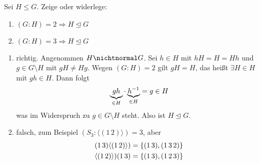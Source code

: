 \begin{uebungsblatt}
\setcounter{taskcount}{40}

\begin{uebung}[Präsens]
	Sei $H\le G$. Zeige oder widerlege:
	\begin{enumerate}[label=\alph*)]
		\item $(G\colon H) = 2\Rightarrow H\unlhd G$
		\item $(G\colon H) = 3\Rightarrow H\unlhd G$
	\end{enumerate}
\end{uebung}
\begin{loesung}
	\begin{enumerate}[label=\alph*)]
		\item richtig. Angenommen $H\nichtnormal G$. Sei $h\in H$ mit $hH=H=Hh$ und $g\in G\setminus H$ mit $gH\neq Hg$. Wegen $(G\colon H)=2$ gilt $gH=H$, das heißt $\exists H\in H$ mit $gh\in H$. Dann folgt
		\begin{align}
			\underbrace{gh}_{\in H}\cdot \underbrace{h^{-1}}_{\in H} = g\in H\notag
		\end{align}
		was im Widerspruch zu $g\in G\setminus H$ steht. Also ist $H\unlhd G$.
		\item falsch, zum Beispiel $(S_3\colon \langle (1\, 2)\rangle)=3$, aber
		\begin{align}
			(1\, 3)\langle (1\, 2)\rangle) &= \{(1\, 3),(1\, 3\, 2)\} \notag \\
			\langle (1\, 2)\rangle)(1\, 3) &= \{(1\, 3),(1\, 2\, 3)\} \notag
		\end{align}
	\end{enumerate}
\end{loesung}

\end{uebungsblatt}